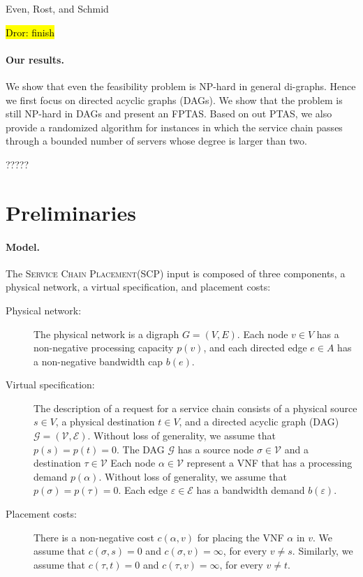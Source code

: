 \documentclass[runningheads]{llncs}
\newcommand{\eps}{\varepsilon}
\newcommand{\scp}{\textsc{SCP}\xspace}
\newcommand{\scplong}{\textsc{Service Chain Placement}\xspace}
\newcommand{\calE}{\mathcal{E}}
\newcommand{\calG}{\mathcal{G}}
\newcommand{\calV}{\mathcal{V}}
\newcommand{\dror}[1]{\sethlcolor{yellow}\hl{Dror: #1}}
\begin{document}
Even, Rost, and Schmid~\cite{ERS16}

\dror{finish}

\paragraph*{\bf Our results.}
%
We show that even the feasibility problem is NP-hard in general
di-graphs.  Hence we first focus on directed acyclic graphs (DAGs).
We show that the problem is still NP-hard in DAGs and present an
FPTAS.
%
Based on out PTAS, we also provide a randomized algorithm for
instances in which the service chain passes through a bounded number
of servers whose degree is larger than two.

?????

\bigskip




\section{Preliminaries}


\paragraph*{\bf Model.}
%
The \scplong (\scp) input is composed of three components, a physical
network, a virtual specification, and placement costs:
\begin{description}
\item[Physical network:]
%
  The physical network is a digraph $G = (V,E)$.  Each node $v \in V$
  has a non-negative processing capacity $p(v)$, and each directed
  edge $e \in A$ has a non-negative bandwidth cap $b(e)$.

\item[Virtual specification:]
%
  The description of a request for a service chain consists of a
  physical source $s \in V$, a physical destination $t \in V$, and a
  directed acyclic graph (DAG) $\calG = (\calV,\calE)$.
%
  Without loss of generality, we assume that $p(s) = p(t) = 0$.  
%
  The DAG $\calG$ has a source node $\sigma \in \calV$ and a
  destination $\tau \in \calV$ Each node $\alpha \in \calV$ represent
  a VNF that has a processing demand $p(\alpha)$.  Without loss of
  generality, we assume that $p(\sigma) = p(\tau) = 0$.  Each edge
  $\eps \in \calE$ has a bandwidth demand $b(\eps)$.
  
\item[Placement costs:]
%
  There is a non-negative cost $c(\alpha,v)$ for placing the VNF
  $\alpha$ in $v$.  We assume that $c(\sigma,s) = 0$ and $c(\sigma,v)
  = \infty$, for every $v \neq s$.  Similarly, we assume that
  $c(\tau,t) = 0$ and $c(\tau,v) = \infty$, for every $v \neq t$.
\end{description}
\end{document}
